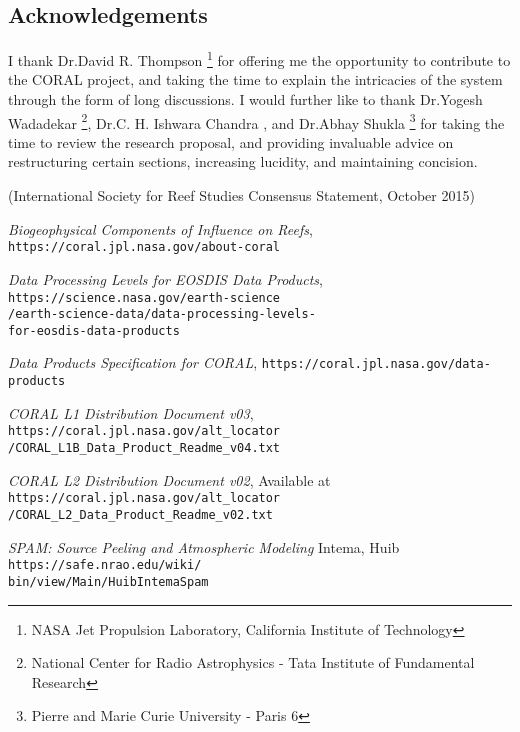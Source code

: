 \documentclass{article}
\begin{document}
\begin{multicols*}{2}
\section*{Acknowledgements}
I thank Dr.David R. Thompson \footnote{NASA Jet Propulsion Laboratory, California Institute of Technology} for offering me the opportunity to contribute to the CORAL project, and taking the time to explain the intricacies of the system through the form of long discussions. I would further like to thank Dr.Yogesh Wadadekar \footnote{\label{NCRA-TIFR} National Center for Radio Astrophysics - Tata Institute of Fundamental Research}, Dr.C. H. Ishwara Chandra \footnotemark[\ref{NCRA-TIFR}], and Dr.Abhay Shukla \footnote{Pierre and Marie Curie University - Paris 6} for taking the time to review the research proposal, and providing invaluable advice on restructuring certain sections, increasing lucidity, and maintaining concision.

\begin{thebibliography}{10}
(International Society for Reef Studies Consensus Statement, October 2015)

\emph{Biogeophysical Components of Influence on Reefs},
\texttt{https://coral.jpl.nasa.gov/about-coral}

\emph{Data Processing Levels for EOSDIS Data Products},
\texttt{https://science.nasa.gov/earth-science\\/earth-science-data/data-processing-levels-\\for-eosdis-data-products}

\emph{Data Products Specification for CORAL},
\texttt{https://coral.jpl.nasa.gov/data-products}

\emph{CORAL L1 Distribution Document v03},
\texttt{https://coral.jpl.nasa.gov/alt\_locator\\/CORAL\_L1B\_Data\_Product\_Readme\_v04.txt}

\emph{CORAL L2 Distribution Document v02},
Available at 
\texttt{https://coral.jpl.nasa.gov/alt\_locator\\/CORAL\_L2\_Data\_Product\_Readme\_v02.txt}

\emph{SPAM: Source Peeling and Atmospheric Modeling}
Intema, Huib
\texttt{https://safe.nrao.edu/wiki/\\bin/view/Main/HuibIntemaSpam}

\end{thebibliography}
\end{multicols*}
\end{document}
